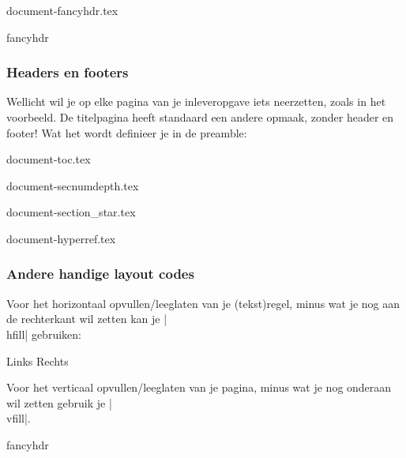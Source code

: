 \documentclass{cursuspresentatie}
\def\importslide#1#2{%
	{#2}
}
\begin{document}
\importslide{document}{document-fancyhdr.tex}

\begin{saveblock}{fancyhdr}
    \begin{highlightblock}
        \usepackage{fancyhdr}
        \pagestyle{fancy}
        \fancyhf{}
    \end{highlightblock}
\end{saveblock}

\begin{frame}
	\frametitle{Headers en footers}
	Wellicht wil je op elke pagina van je inleveropgave iets neerzetten, zoals
	in het voorbeeld. De titelpagina heeft standaard een andere opmaak, zonder
	header en footer! Wat het wordt definieer je in de preamble:

\end{frame}


\importslide{document}{document-toc.tex}

\importslide{document}{document-secnumdepth.tex}

\importslide{document}{document-section_star.tex}

\importslide{document}{document-hyperref.tex}


\begin{frame}
	\frametitle{Andere handige layout codes}
	Voor het horizontaal opvullen/leeglaten van je (tekst)regel, minus wat je
	nog aan de rechterkant wil zetten kan je \hll|\\hfill|
	gebruiken:

	Links \hfill Rechts
	
	Voor het verticaal opvullen/leeglaten van je pagina, \vfill minus wat je nog
	onderaan wil zetten gebruik je \hll|\\vfill|.
\end{frame}

\begin{saveblock}{fancyhdr}
    \begin{highlightblock}
        \usepackage{fancyhdr,lastpage}
        \pagestyle{fancy}
        \fancyhf{}
    \end{highlightblock}
\end{saveblock}
\end{document}
